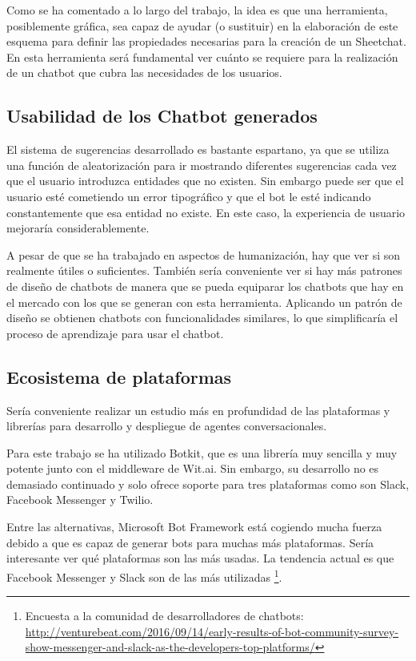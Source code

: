 Como se ha comentado a lo largo del trabajo, la idea es que una herramienta, posiblemente gráfica, sea capaz de ayudar (o sustituir) en la elaboración de este esquema para definir las propiedades necesarias para la creación de un Sheetchat. En esta herramienta será fundamental ver cuánto se requiere para la realización de un chatbot que cubra las necesidades de los usuarios.

\subsection{Usabilidad de los Chatbot generados}

El sistema de sugerencias desarrollado es bastante espartano, ya que se utiliza una función de aleatorización para ir mostrando diferentes sugerencias cada vez que el usuario introduzca entidades que no existen. Sin embargo puede ser que el usuario esté cometiendo un error tipográfico y que el bot le esté indicando constantemente que esa entidad no existe. En este caso, la experiencia de usuario mejoraría considerablemente.

A pesar de que se ha trabajado en aspectos de humanización, hay que ver si son realmente útiles o suficientes. También sería conveniente ver si hay más patrones de diseño de chatbots de manera que se pueda equiparar los chatbots que hay en el mercado con los que se generan con esta herramienta. Aplicando un patrón de diseño se obtienen chatbots con funcionalidades similares, lo que simplificaría el proceso de aprendizaje para usar el chatbot.

\subsection{Ecosistema de plataformas}

Sería conveniente realizar un estudio más en profundidad de las plataformas y librerías para desarrollo y despliegue de agentes conversacionales.

Para este trabajo se ha utilizado Botkit, que es una librería muy sencilla y muy potente junto con el middleware de Wit.ai. Sin embargo, su desarrollo no es demasiado continuado y solo ofrece soporte para tres plataformas como son Slack, Facebook Messenger y Twilio. 

Entre las alternativas, Microsoft Bot Framework está cogiendo mucha fuerza debido a que es capaz de generar bots para muchas más plataformas. Sería interesante ver qué plataformas son las más usadas. La tendencia actual es que Facebook Messenger y Slack son de las más utilizadas \footnote{Encuesta a la comunidad de desarrolladores de chatbots: \url{http://venturebeat.com/2016/09/14/early-results-of-bot-community-survey-show-messenger-and-slack-as-the-developers-top-platforms/}}.


